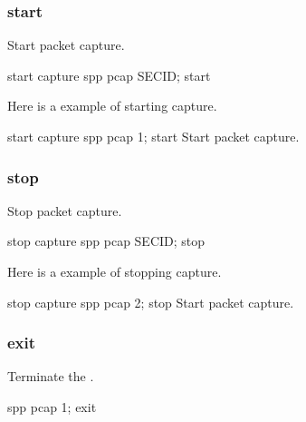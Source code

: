\documentclass[a4paper,11pt,openany,oneside,english]{sphinxmanual}
\begin{document}
\subsubsection{start}
\label{\detokenize{commands/secondary/spp_pcap:start}}\label{\detokenize{commands/secondary/spp_pcap:commands-spp-pcap-start}}
Start packet capture.

\begin{sphinxVerbatim}[commandchars=\\\{\},formatcom=\footnotesize]
\PYGZsh{} start capture
spp \PYGZgt{} pcap SEC\PYGZus{}ID; start
\end{sphinxVerbatim}

Here is a example of starting capture.

\begin{sphinxVerbatim}[commandchars=\\\{\},formatcom=\footnotesize]
\PYGZsh{} start capture
spp \PYGZgt{} pcap 1; start
Start packet capture.
\end{sphinxVerbatim}


\subsubsection{stop}
\label{\detokenize{commands/secondary/spp_pcap:stop}}\label{\detokenize{commands/secondary/spp_pcap:commands-spp-pcap-stop}}
Stop packet capture.

\begin{sphinxVerbatim}[commandchars=\\\{\},formatcom=\footnotesize]
\PYGZsh{} stop capture
spp \PYGZgt{} pcap SEC\PYGZus{}ID; stop
\end{sphinxVerbatim}

Here is a example of stopping capture.

\begin{sphinxVerbatim}[commandchars=\\\{\},formatcom=\footnotesize]
\PYGZsh{} stop capture
spp \PYGZgt{} pcap 2; stop
Start packet capture.
\end{sphinxVerbatim}


\subsubsection{exit}
\label{\detokenize{commands/secondary/spp_pcap:exit}}\label{\detokenize{commands/secondary/spp_pcap:commands-spp-pcap-exit}}
Terminate the .

\begin{sphinxVerbatim}[commandchars=\\\{\},formatcom=\footnotesize]
spp \PYGZgt{} pcap 1; exit
\end{sphinxVerbatim}
\end{document}
